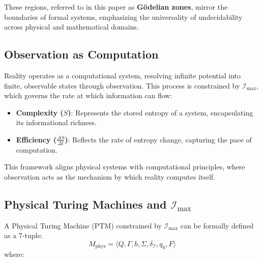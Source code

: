 \documentclass[12pt]{article}
\begin{document}
These regions, referred to in this paper as \textbf{Gödelian zones}, mirror the boundaries of formal systems, emphasizing the universality of undecidability across physical and mathematical domains.

\subsection{Observation as Computation}

Reality operates as a computational system, resolving infinite potential into finite, observable states through observation. This process is constrained by \(\mathcal{I}_{\text{max}}\), which governs the rate at which information can flow:
\begin{itemize}
    \item \textbf{Complexity (\(S\))}: Represents the stored entropy of a system, encapsulating its informational richness.
    \item \textbf{Efficiency (\(\frac{\Delta S}{\Delta t}\))}: Reflects the rate of entropy change, capturing the pace of computation.
\end{itemize}

This framework aligns physical systems with computational principles, where observation acts as the mechanism by which reality computes itself.


\subsection{Physical Turing Machines and \(\mathcal{I}_{\text{max}}\)}

A Physical Turing Machine (PTM) constrained by \(\mathcal{I}_{\text{max}}\) can be formally defined as a 7-tuple:
\[
M_{\text{phys}} = \langle Q, \Gamma, b, \Sigma, \delta_{\mathcal{I}}, q_0, F \rangle
\]
where:
\end{document}
